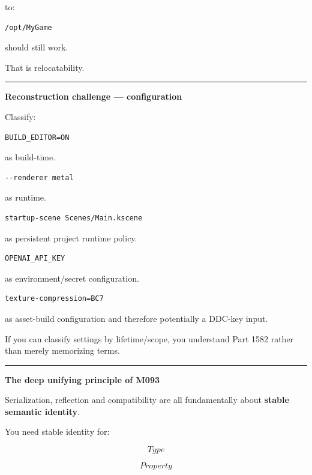 to:

\begin{verbatim}
/opt/MyGame
\end{verbatim}

should still work.

That is relocatability.

\begin{center}\rule{0.5\linewidth}{0.5pt}\end{center}

\textbf{Reconstruction challenge --- configuration}

Classify:

\begin{verbatim}
BUILD_EDITOR=ON
\end{verbatim}

as build-time.

\begin{verbatim}
--renderer metal
\end{verbatim}

as runtime.

\begin{verbatim}
startup-scene Scenes/Main.kscene
\end{verbatim}

as persistent project runtime policy.

\begin{verbatim}
OPENAI_API_KEY
\end{verbatim}

as environment/secret configuration.

\begin{verbatim}
texture-compression=BC7
\end{verbatim}

as asset-build configuration and therefore potentially a DDC-key input.

If you can classify settings by lifetime/scope, you understand Part 1582 rather than merely memorizing terms.

\begin{center}\rule{0.5\linewidth}{0.5pt}\end{center}

\textbf{The deep unifying principle of M093}

Serialization, reflection and compatibility are all fundamentally about \textbf{stable semantic identity}.

You need stable identity for:

\[
Type
\]

\[
Property
\]

